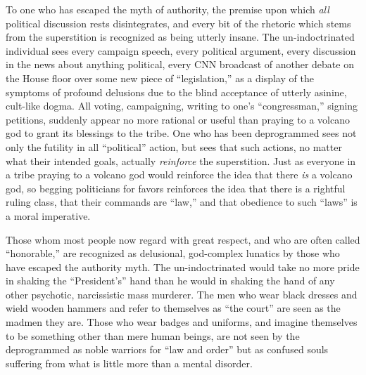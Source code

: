 \documentclass{book}
\begin{document}
To one who has escaped the myth of authority, the premise upon which \emph{all} political discussion rests disintegrates, and every bit of the rhetoric which stems from the superstition is recognized as being utterly insane. The un-indoctrinated individual sees every campaign speech, every political argument, every discussion in the news about anything political, every CNN broadcast of another debate on the House floor over some new piece of \enquote{legislation,} as a display of the symptoms of profound delusions due to the blind acceptance of utterly asinine, cult-like dogma. All voting, campaigning, writing to one's \enquote{congressman,} signing petitions, suddenly appear no more rational or useful than praying to a volcano god to grant its blessings to the tribe. One who has been deprogrammed sees not only the futility in all \enquote{political} action, but sees that such actions, no matter what their intended goals, actually \emph{reinforce} the superstition. Just as everyone in a tribe praying to a volcano god would reinforce the idea that there \emph{is} a volcano god, so begging politicians for favors reinforces the idea that there is a rightful ruling class, that their commands are \enquote{law,} and that obedience to such \enquote{laws} is a moral imperative.

Those whom most people now regard with great respect, and who are often called \enquote{honorable,} are recognized as delusional, god-complex lunatics by those who have escaped the authority myth. The un-indoctrinated would take no more pride in shaking the \enquote{President's} hand than he would in shaking the hand of any other psychotic, narcissistic mass murderer. The men who wear black dresses and wield wooden hammers and refer to themselves as \enquote{the court} are seen as the madmen they are. Those who wear badges and uniforms, and imagine themselves to be something other than mere human beings, are not seen by the deprogrammed as noble warriors for \enquote{law and order} but as confused souls suffering from what is little more than a mental disorder.
\end{document}
